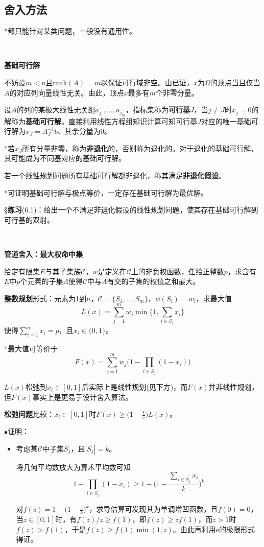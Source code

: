 \documentclass[a4paper,UTF8,fontset=windows]{ctexart}
\newcommand{\exce}[2]{\S\textbf{练习}(#1)：{\kaishu #2}}
\newcommand{\proo}[1]{{\kaishu $\bullet$证明：
\begin{itemize}
    \item[] #1
\end{itemize}
}}
\newcommand{\er}{\mathrm{e}}
\begin{document}
\subsection{舍入方法}
*都只能针对某类问题，一般没有通用性。

\

\textbf{基础可行解}

不妨设$m<n$且$\mathrm{rank}(A)=m$以保证可行域非空。由已证，$x$为$\Omega$的顶点当且仅当$A$的对应列向量线性无关。由此，顶点$x$最多有$m$个非零分量。

设$A$的列的某极大线性无关组$a_{j_1},\dots,a_{j_m}$，指标集称为\textbf{可行基}$J$，当$j\ne J$时$x_j=0$的解称为\textbf{基础可行解}。直接利用线性方程组知识计算可知可行基$J$对应的唯一基础可行解为$x_J=A_J^{-1}b$、其余分量为0。

*若$x_J$所有分量非零，称为\textbf{非退化}的，否则称为退化的。对于退化的基础可行解，其可能成为不同基对应的基础可行解。

若一个线性规划问题所有基础可行解都非退化，称其满足\textbf{非退化假设}。

*可证明基础可行解与极点等价，一定存在基础可行解为最优解。

\exce{6.1}{给出一个不满足非退化假设的线性规划问题，使其存在基础可行解到可行基的双射。}

\

\textbf{管道舍入：最大权命中集}

给定有限集$E$与其子集族$\mathcal{C}$，$w$是定义在$\mathcal{C}$上的非负权函数，任给正整数$p$，求含有$E$中$p$个元素的子集$A$使得$\mathcal{C}$中与$A$有交的子集的权值之和最大。

\textbf{整数规划}形式：元素为1到$n$，$\mathcal{C}=\{S_1,\dots,S_m\}$，$w(S_i)=w_i$，求最大值
$$L(x)=\sum_{j=1}^mw_j\min\bigg\{1,\sum_{i\in S_j}x_i\bigg\}$$
使得$\sum_{i=1}^nx_i=p$，且$x_i\in\{0,1\}$。

*最大值可等价于
$$F(x)=\sum_{j=1}^mw_j\bigg(1-\prod_{i\in S_j}(1-x_i)\bigg)$$

$L(x)$松弛到$x_i\in[0,1]$后实际上是线性规划(见下方)，而$F(x)$并非线性规划，但$F(x)$事实上是更易于设计舍入算法。

\textbf{松弛问题}比较：$x_i\in[0,1]$时$F(x)\ge\big(1-\frac{1}{\er}\big)L(x)$。

\proo{
    考虑某$\mathcal{C}$中子集$S_j$，且$|S_j|=k$。

    将几何平均数放大为算术平均数可知
    $$1-\prod_{i\in S_j}(1-x_i)\ge1-\bigg(1-\frac{\sum_{i\in S_j}x_i}{k}\bigg)^k$$

    对$f(z)=1-\big(1-\frac{z}{k}\big)^k$，求导估算可发现其为单调增凹函数，且$f(0)=0$，当$z\in[0,1]$时，有$f(z)/z\ge f(1)$，即$f(z)\ge zf(1)$，而$z>1$时$f(z)>f(1)$，于是$f(z)\ge f(1)\min(1,z)$。由此再利用$\er$的极限形式得证。
}
\end{document}

